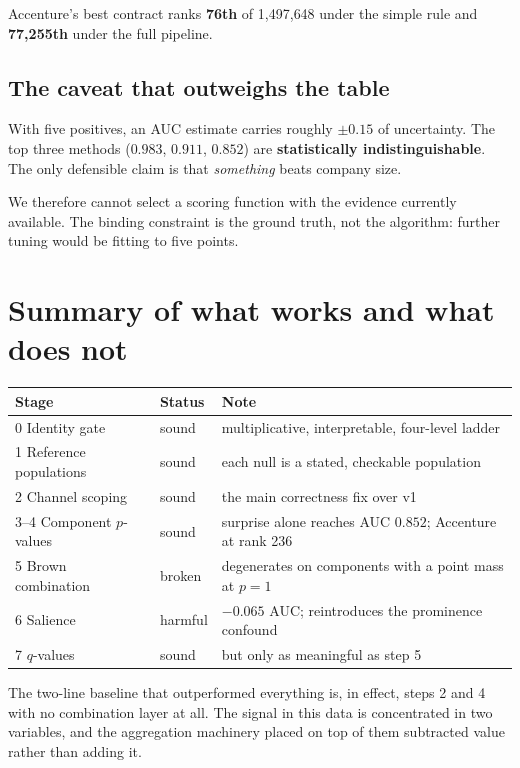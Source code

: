 \documentclass[11pt,a4paper]{article}
\begin{document}
Accenture's best contract ranks \textbf{76th} of 1{,}497{,}648 under the simple rule and
\textbf{77{,}255th} under the full pipeline.

\subsection*{The caveat that outweighs the table}

With five positives, an AUC estimate carries roughly $\pm 0.15$ of uncertainty. The top
three methods ($0.983$, $0.911$, $0.852$) are \textbf{statistically indistinguishable}.
The only defensible claim is that \emph{something} beats company size.

We therefore cannot select a scoring function with the evidence currently available. The
binding constraint is the ground truth, not the algorithm: further tuning would be
fitting to five points.

\section*{Summary of what works and what does not}

\begin{center}\small
\begin{tabular}{@{}llp{7.4cm}@{}}
\toprule
\textbf{Stage} & \textbf{Status} & \textbf{Note} \\
\midrule
0 Identity gate        & sound & multiplicative, interpretable, four-level ladder \\
1 Reference populations& sound & each null is a stated, checkable population \\
2 Channel scoping      & sound & the main correctness fix over v1 \\
3--4 Component $p$-values & sound & surprise alone reaches AUC $0.852$; Accenture at rank 236 \\
5 Brown combination    & \textcolor{mulberry}{broken} & degenerates on components with a point mass at $p=1$ \\
6 Salience             & \textcolor{mulberry}{harmful} & $-0.065$ AUC; reintroduces the prominence confound \\
7 $q$-values           & sound & but only as meaningful as step 5 \\
\bottomrule
\end{tabular}
\end{center}

The two-line baseline that outperformed everything is, in effect, steps 2 and 4 with no
combination layer at all. The signal in this data is concentrated in two variables, and
the aggregation machinery placed on top of them subtracted value rather than adding it.
\end{document}
